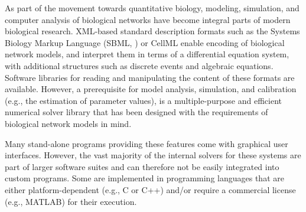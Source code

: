 \documentclass{bioinfo}
\begin{document}
As part of the movement towards quantitative biology, modeling, 
simulation, and computer analysis of biological networks have become integral
parts of modern biological research. XML-based standard description formats
such as the Systems Biology Markup Language (SBML, \citealt{Hucka2004}) or
CellML \citep{Lloyd2004} enable encoding of biological network models, and
interpret them in terms of a differential equation system, with additional
structures such as discrete events and algebraic equations.
Software libraries for reading and manipulating the content of
these formats are available.
However, a prerequisite for model analysis, simulation, and calibration (e.g., the
estimation of parameter values), is a multiple-purpose and 
efficient numerical solver library that has been designed with the
requirements of biological network models in mind.

Many stand-alone programs providing these features come with
graphical user interfaces.
However, the vast majority of the internal solvers for these systems are part of
larger software suites and can therefore not be easily integrated into custom
programs. Some are implemented in programming languages that are either
platform-dependent (e.g., C or C++) and/or require a commercial license (e.g.,
MATLAB\texttrademark{}) for their execution.
%
%
%
\end{document}
